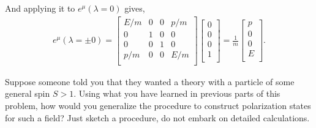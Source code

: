 \documentclass[working, oneside]{../../../Preambles/tuftebook}
\begin{document}
And applying it to $e^{\mu }\left( \lambda = 0 \right) $ gives,
\begin{align*}
    e^{\mu }\left( \lambda = \pm 0 \right) = 
\begin{bmatrix}
    E /m & 0 & 0 & p /m \\
    0 & 1 & 0 & 0 \\
    0 & 0 & 1 & 0 \\
    p /m & 0 & 0& E /m \\
\end{bmatrix}
\begin{bmatrix}
    0 \\
    0 \\
    0\\
    1 \\
\end{bmatrix}
= \frac{1}{m}
\begin{bmatrix}
    p \\
0 \\
0\\
    E \\
\end{bmatrix}
.\end{align*}
\begin{exercise}[7]
Suppose someone told you that they wanted a theory with a particle of some 
general spin $S>1$. Using what you have learned in previous parts of this problem, how 
would you generalize the procedure to construct polarization states for such a field? 
Just sketch a procedure, do not embark on detailed calculations. 
\end{exercise}
\end{document}
